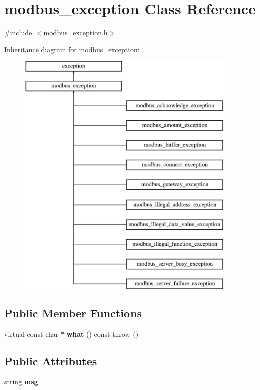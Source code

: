 \hypertarget{classmodbus__exception}{}\section{modbus\+\_\+exception Class Reference}
\label{classmodbus__exception}


{\ttfamily \#include $<$modbus\+\_\+exception.\+h$>$}

Inheritance diagram for modbus\+\_\+exception\+:\begin{figure}[H]
\begin{center}
\leavevmode
\includegraphics[height=12.000000cm]{classmodbus__exception}
\end{center}
\end{figure}
\subsection*{Public Member Functions}
\begin{DoxyCompactItemize}
\item 
\mbox{\label{classmodbus__exception_a88e2babcdc6ee2b05b31523a17b649df}} 
virtual const char $\ast$ {\bfseries what} () const  throw ()
\end{DoxyCompactItemize}
\subsection*{Public Attributes}
\begin{DoxyCompactItemize}
\item 
\mbox{\label{classmodbus__exception_a96a89c2a5fafb8c5c11f04b93dfc616e}} 
string {\bfseries msg}
\end{DoxyCompactItemize}


